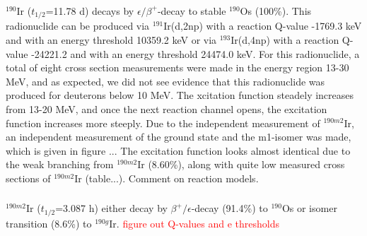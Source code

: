 \subsubsection{}
$^{190}$Ir ($t_{1/2}$=11.78 d) decays by $\epsilon/\beta^+$-decay to stable $^{190}$Os (100\%). This radionuclide can be produced via $^{191}$Ir(d,2np) with a reaction Q-value -1769.3 keV and with an energy threshold 10359.2 keV or via $^{193}$Ir(d,4np) with a reaction Q-value -24221.2 and with an energy threshold 24474.0 keV. For this radionuclide, a total of eight cross section measurements were made in the energy region 13-30 MeV, and as expected, we did not see evidence that this radionuclide was produced for deuterons below 10 MeV. The xcitation function steadely increases from 13-20 MeV, and once the next reaction channel opens, the excitation function increases more steeply. Due to the independent measurement of $^{190m2}$Ir, an independent measurement of the ground state and the m1-isomer was made, which is given in figure ... The excitation function looks almost identical due to the weak branching from $^{190m2}$Ir (8.60\%), along with quite low measured cross sections of $^{190m2}$Ir (table...). Comment on reaction models. 

\subsubsection{}
$^{190m2}$Ir ($t_{1/2}$=3.087 h) either decay by $\beta^+/\epsilon$-decay (91.4\%) to $^{190}$Os or isomer transition (8.6\%) to $^{190g}$Ir. \textcolor{red}{figure out Q-values and e thresholds}

